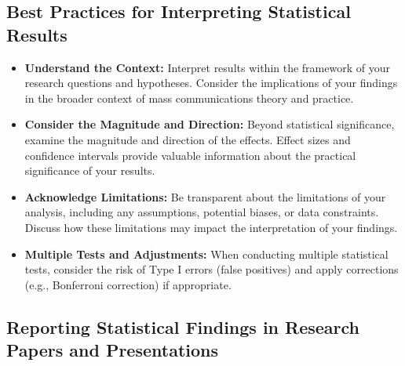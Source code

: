 \documentclass[
]{book}
\begin{document}
\hypertarget{best-practices-for-interpreting-statistical-results}{%
\subsection*{Best Practices for Interpreting Statistical Results}\label{best-practices-for-interpreting-statistical-results}}

\begin{itemize}
\item
  \textbf{Understand the Context:} Interpret results within the framework of your research questions and hypotheses. Consider the implications of your findings in the broader context of mass communications theory and practice.
\item
  \textbf{Consider the Magnitude and Direction:} Beyond statistical significance, examine the magnitude and direction of the effects. Effect sizes and confidence intervals provide valuable information about the practical significance of your results.
\item
  \textbf{Acknowledge Limitations:} Be transparent about the limitations of your analysis, including any assumptions, potential biases, or data constraints. Discuss how these limitations may impact the interpretation of your findings.
\item
  \textbf{Multiple Tests and Adjustments:} When conducting multiple statistical tests, consider the risk of Type I errors (false positives) and apply corrections (e.g., Bonferroni correction) if appropriate.
\end{itemize}

\hypertarget{reporting-statistical-findings-in-research-papers-and-presentations}{%
\subsection*{Reporting Statistical Findings in Research Papers and Presentations}\label{reporting-statistical-findings-in-research-papers-and-presentations}}
\end{document}
